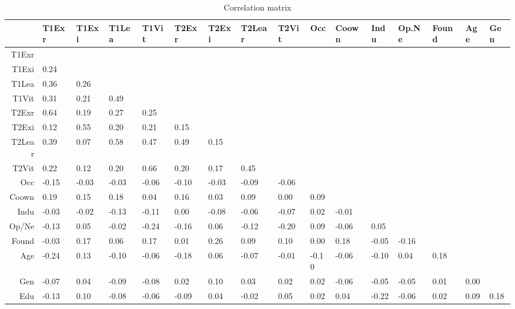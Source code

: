 \documentclass[man, 12pt, a4paper, noextraspace]{apa6}
\begin{document}
\begin{table}
\caption{Correlation matrix}
\centering
\begin{tabular}{rlllllllllllllll}
  \toprule
 & T1Exr & T1Exi & T1Lea & T1Vit & T2Exr & T2Exi & T2Lear & T2Vit & Occ & Coown & Indu & Op.Ne & Found & Age & Gen \\ 
  \midrule
T1Exr &  &  &  &  &  &  &  &  &  &  &  &  &  &  &  \\ 
  T1Exi &  0.24 &  &  &  &  &  &  &  &  &  &  &  &  &  &  \\ 
  T1Lea &  0.36 &  0.26 &  &  &  &  &  &  &  &  &  &  &  &  &  \\ 
  T1Vit &  0.31 &  0.21 &  0.49 &  &  &  &  &  &  &  &  &  &  &  &  \\ 
  T2Exr &  0.64 &  0.19 &  0.27 &  0.25 &  &  &  &  &  &  &  &  &  &  &  \\ 
  T2Exi &  0.12 &  0.55 &  0.20 &  0.21 &  0.15 &  &  &  &  &  &  &  &  &  &  \\ 
  T2Lear &  0.39 &  0.07 &  0.58 &  0.47 &  0.49 &  0.15 &  &  &  &  &  &  &  &  &  \\ 
  T2Vit &  0.22 &  0.12 &  0.20 &  0.66 &  0.20 &  0.17 &  0.45 &  &  &  &  &  &  &  &  \\ 
  Occ & -0.15 & -0.03 & -0.03 & -0.06 & -0.10 & -0.03 & -0.09 & -0.06 &  &  &  &  &  &  &  \\ 
  Coown &  0.19 &  0.15 &  0.18 &  0.04 &  0.16 &  0.03 &  0.09 &  0.00 &  0.09 &  &  &  &  &  &  \\ 
  Indu & -0.03 & -0.02 & -0.13 & -0.11 &  0.00 & -0.08 & -0.06 & -0.07 &  0.02 & -0.01 &  &  &  &  &  \\ 
  Op/Ne & -0.13 &  0.05 & -0.02 & -0.24 & -0.16 &  0.06 & -0.12 & -0.20 &  0.09 & -0.06 &  0.05 &  &  &  &  \\ 
  Found & -0.03 &  0.17 &  0.06 &  0.17 &  0.01 &  0.26 &  0.09 &  0.10 &  0.00 &  0.18 & -0.05 & -0.16 &  &  &  \\ 
  Age & -0.24 &  0.13 & -0.10 & -0.06 & -0.18 &  0.06 & -0.07 & -0.01 & -0.10 & -0.06 & -0.10 &  0.04 &  0.18 &  &  \\ 
  Gen & -0.07 &  0.04 & -0.09 & -0.08 &  0.02 &  0.10 &  0.03 &  0.02 &  0.02 & -0.06 & -0.05 & -0.05 &  0.01 &  0.00 &  \\ 
  Edu & -0.13 &  0.10 & -0.08 & -0.06 & -0.09 &  0.04 & -0.02 &  0.05 &  0.02 &  0.04 & -0.22 & -0.06 &  0.02 &  0.09 &  0.18 \\ 
   \bottomrule

\end{tabular}
\end{table}
\end{document}
